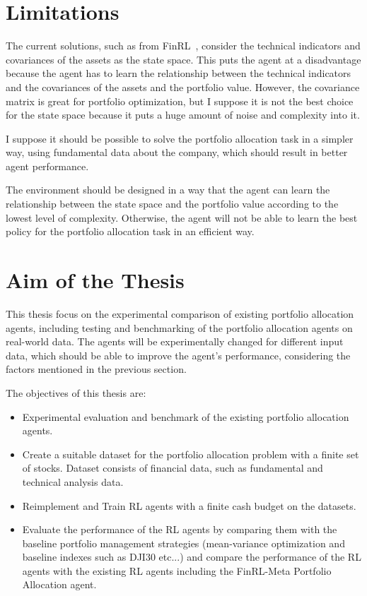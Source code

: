 \section{Limitations}\label{sec:limitations}

The current solutions, such as from FinRL~\cite{finrl-portfolio-allocation-2020}, consider the technical indicators and covariances of the assets as the state space.
This puts the agent at a disadvantage because the agent has to learn the relationship between the technical indicators and the covariances of the assets and the portfolio value.
However, the covariance matrix is great for portfolio optimization, but I suppose it is not the best choice for the state space because it puts a huge amount of noise and complexity into it.

I suppose it should be possible to solve the portfolio allocation task in a simpler way, using fundamental data about the company, which should result in better agent performance.

The environment should be designed in a way that the agent can learn the relationship between the state space and the portfolio value according to the lowest level of complexity.
Otherwise, the agent will not be able to learn the best policy for the portfolio allocation task in an efficient way.


\section{Aim of the Thesis}\label{sec:aim-of-the-thesis}
This thesis focus on the experimental comparison of existing portfolio allocation agents, including testing and benchmarking of the portfolio allocation agents on real-world data.
The agents will be experimentally changed for different input data, which should be able to improve the agent's performance, considering the factors mentioned in the previous section.

The objectives of this thesis are:
\begin{itemize}
    \item Experimental evaluation and benchmark of the existing portfolio allocation agents.
    \item Create a suitable dataset for the portfolio allocation problem with a finite set of stocks.
    Dataset consists of financial data, such as fundamental and technical analysis data.
    \item Reimplement and Train RL agents with a finite cash budget on the datasets.
    \item Evaluate the performance of the RL agents by comparing them with the baseline portfolio management strategies (mean-variance optimization and baseline indexes such as DJI30 etc...) and compare the performance of the RL agents with the existing RL agents including the FinRL-Meta Portfolio Allocation agent.
\end{itemize}

